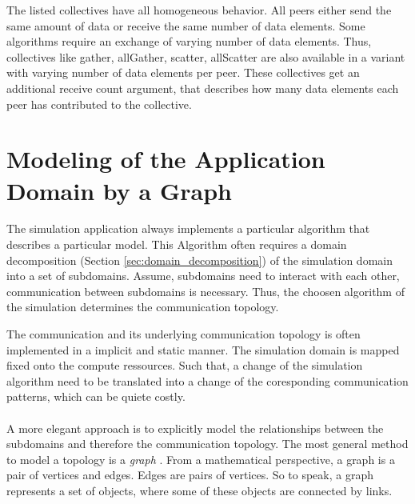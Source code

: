The listed collectives have all homogeneous behavior. All peers either
send the same amount of data or receive the same number of data elements.
Some algorithms require an  exchange of varying number of data elements. Thus,
collectives like gather, allGather, scatter, allScatter are also available
in a variant with varying number of data elements per peer. These collectives
get an additional receive count argument, that describes how many data elements
each peer has contributed to the collective.


\section{Modeling of the Application Domain by a Graph}
\label{sec:graph}
The simulation application always implements a particular algorithm
that describes a particular model. This Algorithm often requires a
domain decomposition (Section \ref{sec:domain_decomposition}) of the
simulation domain into a set of subdomains. Assume, subdomains need
to interact with each other, communication between subdomains is
necessary. Thus, the choosen algorithm of the simulation determines
the communication topology.

The communication and its underlying communication topology is often
implemented in a implicit and static manner. The simulation domain is
mapped fixed onto the compute ressources.  Such that, a change of the
simulation algorithm need to be translated into a change of the
coresponding communication patterns, which can be quiete costly.

\paragraph*{}
A more elegant approach is to explicitly model the relationships
between the subdomains and therefore the communication topology. The
most general method to model a topology is a \textit{graph}
\cite{ref:graph}.  From a mathematical perspective, a graph is a pair
of vertices and edges. Edges are pairs of vertices. So to speak, a
graph represents a set of objects, where some of these objects are
connected by links.

